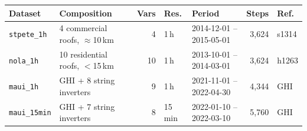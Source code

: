 \begin{tabular}{llrllrl}
\toprule
Dataset & Composition & Vars & Res. & Period & Steps & Ref. \\
\midrule
\texttt{stpete\_1h} & 4 commercial roofs, $\approx$10\,km & 4 & 1\,h & 2014-12-01 -- 2015-05-01 & 3,624 & s1314 \\
\texttt{nola\_1h} & 10 residential roofs, $<$15\,km & 10 & 1\,h & 2013-10-01 -- 2014-03-01 & 3,624 & h1263 \\
\texttt{maui\_1h} & GHI + 8 string inverters & 9 & 1\,h & 2021-11-01 -- 2022-04-30 & 4,344 & GHI \\
\texttt{maui\_15min} & GHI + 7 string inverters & 8 & 15\,min & 2022-01-10 -- 2022-03-10 & 5,760 & GHI \\
\bottomrule
\end{tabular}

